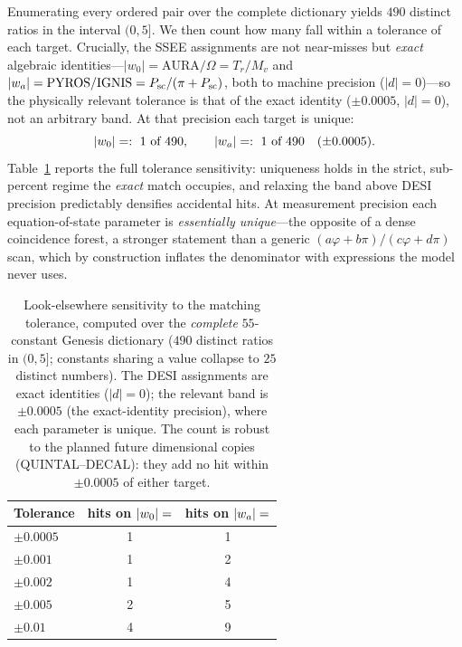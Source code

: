\documentclass[aps,prd,preprint,amsmath,amssymb,nofootinbib,longbibliography]{revtex4-2}
\begin{document}
Enumerating every ordered pair over the complete dictionary yields $490$ distinct
ratios in the interval $(0,5]$. We then count how many fall within a tolerance of
each target. Crucially, the SSEE assignments are not near-misses but \emph{exact}
algebraic identities---$|w_0|=\mathrm{AURA}/\Omega=T_r/M_v$ and
$|w_a|=\mathrm{PYROS}/\mathrm{IGNIS}=P_{\rm sc}/(\pi+P_{\rm sc})$, both to machine precision
($|d|=0$)---so the physically relevant tolerance is that of the exact identity
($\pm0.0005$, $|d|=0$), not an arbitrary band. At that precision each target is
unique:
\begin{equation}
  |w_0|=\val{S_DE_d6}:\ \text{1 of 490},\qquad
  |w_a|=\val{WA_abs_d6}:\ \text{1 of 490}\quad(\pm0.0005).
  \label{eq:lookelsewhere}
\end{equation}
Table~\ref{tab:lookelsewhere-tol} reports the full tolerance sensitivity:
uniqueness holds in the strict, sub-percent regime the \emph{exact} match
occupies, and relaxing the band above DESI precision predictably densifies
accidental hits. At measurement precision each equation-of-state parameter
is \emph{essentially unique}---the opposite of a dense coincidence forest, a
stronger statement than a generic $(a\varphi+b\pi)/(c\varphi+d\pi)$ scan, which
by construction inflates the denominator with expressions the model never uses.

\begin{table}[tbp]
\centering
\caption{Look-elsewhere sensitivity to the matching tolerance, computed over the
\emph{complete} $55$-constant Genesis dictionary ($490$ distinct ratios in
$(0,5]$; constants sharing a value collapse to $25$ distinct
numbers). The DESI assignments are exact identities ($|d|=0$); the relevant band is
$\pm0.0005$ (the exact-identity precision), where each parameter is unique. The count is
robust to the planned future dimensional copies (QUINTAL--DECAL): they add no hit
within $\pm0.0005$ of either target.}
\label{tab:lookelsewhere-tol}
\begin{tabular}{lcc}
\toprule
Tolerance & hits on $|w_0|=\val{S_DE_d6}$ & hits on $|w_a|=\val{WA_abs_d6}$ \\
\midrule
$\pm0.0005$ & 1 & 1 \\
$\pm0.001$  & 1 & 2 \\
$\pm0.002$  & 1 & 4 \\
$\pm0.005$  & 2 & 5 \\
$\pm0.01$   & 4 & 9 \\
\bottomrule
\end{tabular}
\end{table}
\end{document}
